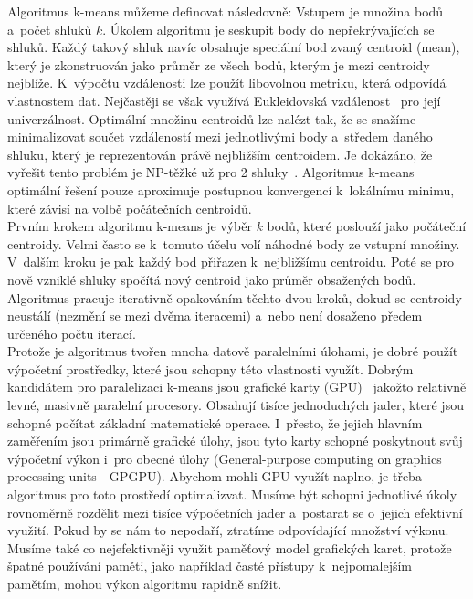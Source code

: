 Algoritmus k-means můžeme definovat následovně: Vstupem je množina bodů a~počet shluků $k$. Úkolem algoritmu je seskupit body do nepřekrývajících se shluků. Každý takový shluk navíc obsahuje speciální bod zvaný centroid (mean), který je zkonstruován jako průměr ze všech bodů, kterým je mezi centroidy nejblíže. K~výpočtu vzdálenosti lze použít libovolnou metriku, která odpovídá vlastnostem dat. Nejčastěji se však využívá Eukleidovská vzdálenost~\cite{Zechner09} pro její univerzálnost. Optimální množinu centroidů lze nalézt tak, že se snažíme minimalizovat součet vzdáleností mezi jednotlivými body a~středem daného shluku, který je reprezentován právě nejbližším centroidem. Je dokázáno, že vyřešit tento problém je NP-těžké už pro 2 shluky~\cite{Drineas04}. Algoritmus k-means optimální řešení pouze aproximuje postupnou konvergencí k~lokálnímu minimu, které závisí na volbě počátečních centroidů.\\

Prvním krokem algoritmu k-means je výběr $k$ bodů, které poslouží jako počáteční centroidy. Velmi často se k~tomuto účelu volí náhodné body ze vstupní množiny. V~dalším kroku je pak každý bod přiřazen k~nejbližšímu centroidu. Poté se pro nově vzniklé shluky spočítá nový centroid jako průměr obsažených bodů. Algoritmus pracuje iterativně opakováním těchto dvou kroků, dokud se centroidy neustálí (nezmění se mezi dvěma iteracemi) a~nebo není dosaženo předem určeného počtu iterací.\\

Protože je algoritmus tvořen mnoha datově paralelními úlohami, je dobré použít výpočetní prostředky, které jsou schopny této vlastnosti využít.
Dobrým kandidátem pro paralelizaci k-means jsou grafické karty (GPU)~\cite{Zechner09} jakožto relativně levné, masivně paralelní procesory. Obsahují tisíce jednoduchých jader, které jsou schopné počítat základní matematické operace. I~přesto, že jejich hlavním zaměřením jsou primárně grafické úlohy, jsou tyto karty schopné poskytnout svůj výpočetní výkon i~pro obecné úlohy (General-purpose computing on graphics processing units - GPGPU). Abychom mohli GPU využít naplno, je třeba algoritmus pro toto prostředí optimalizvat. Musíme být schopni jednotlivé úkoly rovnoměrně rozdělit mezi tisíce výpočetních jader a~postarat se o~jejich efektivní využití. Pokud by se nám to nepodaří, ztratíme odpovídající množství výkonu. Musíme také co nejefektivněji využit paměťový model grafických karet, protože špatné používání paměti, jako na\-pří\-klad časté přístupy k~nejpomalejším pamětím, mohou výkon algoritmu rapidně snížit.\\

